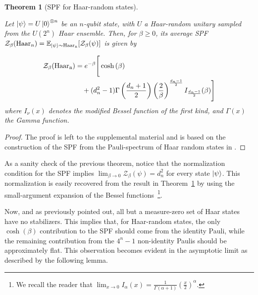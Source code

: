 \documentclass[aps,pra,superscriptaddress,twocolumn,longbibliography]{revtex4-2}
\newtheorem{theorem}{\textbf{Theorem}}
\begin{document}
\begin{theorem}[SPF for Haar-random states]\label{theorem: Pauli_T_Haar_random}

Let $\ket{\psi}=U\ket{0}^{\otimes n}$ be an $n$-qubit state, with $U$ a Haar-random unitary sampled from the $U(2^{n})$ Haar ensemble. Then, for $\beta\geq0$, its average SPF $\mathcal{Z}_{\beta}({\rm Haar}_{n})=\mathbb{E}_{\ket{\psi}\sim \rm{Haar}_{n}}[\mathcal{Z}_{\beta}(\psi)]$ is given by

\begin{align}
    \mathcal{Z}_{\beta}({\rm{Haar}_{n}}) &= e^{-\beta}\Bigg[\cosh{(\beta)}\nonumber \\ 
    &\quad+(d_{n}^{2}-1)\Gamma\left(\frac{d_{n}+1}{2}\right)\left(\frac{2}{\beta}\right)^{\frac{d_{n}-1}{2}}I_{\frac{d_{n}-1}{2}}(\beta)\Bigg]
\end{align}
%
where $I_{\nu}(x)$ denotes the modified Bessel function of the first kind, and $\Gamma(x)$ the Gamma function.
\end{theorem}
\begin{proof}
    The proof is left to the supplemental material and is based on the construction of the SPF from the Pauli-spectrum of Haar random states in \cite{Turkeshi/Pauli_spectrum/2025}. 
\end{proof}

As a sanity check of the previous theorem, notice that the normalization condition for the SPF implies $\lim_{\beta \to 0}\mathcal{Z}_{\beta}(\psi)=d_{n}^{2}$ for every state $\ket{\psi}$. This normalization is easily recovered from the result in Theorem~\ref{theorem: Pauli_T_Haar_random} by using the small-argument expansion of the Bessel functions~\footnote{We recall the reader that $\lim_{x\to 0}I_{\alpha}(x)=\frac{1}{\Gamma(\alpha+1)}\left(\frac{x}{2}\right)^{\alpha}$.}.

Now, and as previously pointed out, all but a measure-zero set of Haar states have no stabilizers. This implies that, for Haar-random states, the only $\cosh{(\beta)}$ contribution to the SPF should come from the identity Pauli, while the remaining contribution from the $4^{n}-1$ non-identity Paulis should be approximately flat. This observation becomes evident in the asymptotic limit as described by the following lemma.
\end{document}

